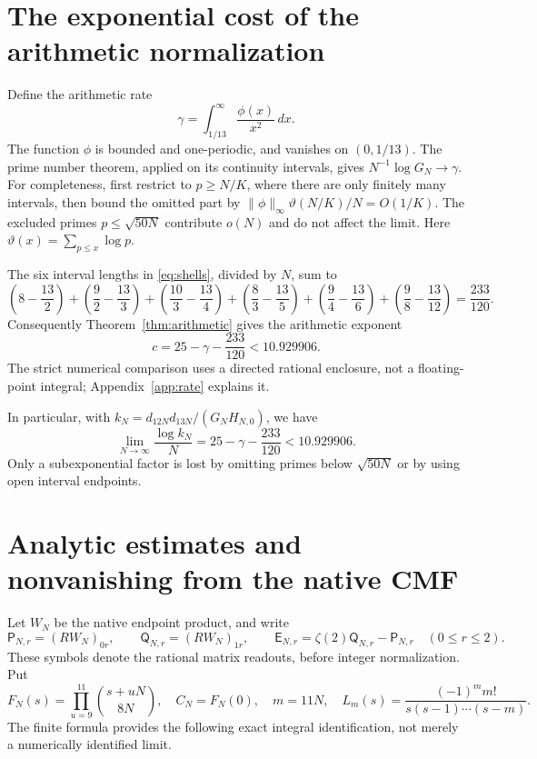 \documentclass[11pt]{article}
\begin{document}
\section{The exponential cost of the arithmetic normalization}
Define the arithmetic rate
\[
 \gamma=\int_{1/13}^{\infty}\frac{\phi(x)}{x^2}\,dx.
\]
The function $\phi$ is bounded and one-periodic, and vanishes on
$(0,1/13)$. The prime number theorem, applied on its continuity
intervals, gives $N^{-1}\log G_N\longrightarrow\gamma$.
For completeness, first restrict to $p\ge N/K$, where there are only
finitely many intervals, then bound the omitted part by
$\|\phi\|_\infty\vartheta(N/K)/N=O(1/K)$. The excluded primes
$p\le\sqrt{50N}$ contribute $o(N)$ and do not affect the limit.
Here $\vartheta(x)=\sum_{p\le x}\log p$.

The six interval lengths in \eqref{eq:shells}, divided by $N$, sum to
\[
 \left(8-\frac{13}2\right)+\left(\frac92-\frac{13}3\right)
 +\left(\frac{10}3-\frac{13}4\right)
 +\left(\frac83-\frac{13}5\right)
 +\left(\frac94-\frac{13}6\right)
 +\left(\frac98-\frac{13}{12}\right)=\frac{233}{120}.
\]
Consequently Theorem~\ref{thm:arithmetic} gives the arithmetic
exponent
\[
 c=25-\gamma-\frac{233}{120}<10.929906.
\]
The strict numerical comparison uses a directed rational enclosure,
not a floating-point integral; Appendix~\ref{app:rate} explains it.


In particular, with
$k_N=d_{12N}d_{13N}/(G_NH_{N,0})$, we have
\[
 \lim_{N\to\infty}\frac{\log k_N}{N}
 =25-\gamma-\frac{233}{120}<10.929906.
\]
Only a subexponential factor is lost by omitting primes below
$\sqrt{50N}$ or by using open interval endpoints.


\section{Analytic estimates and nonvanishing from the native CMF}

Let $W_N$ be the native endpoint product, and write
\[
 \mathsf P_{N,r}=(RW_N)_{0r},\qquad
 \mathsf Q_{N,r}=(RW_N)_{1r},\qquad
 \mathsf E_{N,r}=\zeta(2)\mathsf Q_{N,r}-\mathsf P_{N,r}
 \quad(0\le r\le2).
\]
These symbols denote the rational matrix readouts, before integer
normalization.  Put
\[
 F_N(s)=\prod_{u=9}^{11}\binom{s+uN}{8N},\quad
 C_N=F_N(0),\quad m=11N,\quad
 L_m(s)=\frac{(-1)^m m!}{s(s-1)\cdots(s-m)}.
\]
The finite formula provides the following exact integral identification,
not merely a numerically identified limit.
\end{document}
